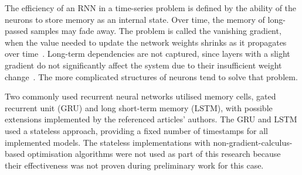 %
The efficiency of an RNN in a time-series problem is defined by the ability of the neurons to store memory as an internal state.
Over time, the memory of long-passed samples may fade away.
The problem is called the vanishing gradient, when the value needed to update the network weights shrinks as it propagates over time~\cite{rasifaghihi_predictive_2020}.
Long-term dependencies are not captured, since layers with a slight gradient do not significantly affect the system due to their insufficient weight change~\cite{rasifaghihi_predictive_2020,hochreiter_vanishing_1998}.
The more complicated structures of neurons tend to solve that problem.

%
Two commonly used recurrent neural networks utilised memory cells, gated recurrent unit (GRU) and long short-term memory (LSTM), with possible extensions implemented by the referenced articles' authors.
The GRU and LSTM used a stateless approach, providing a fixed number of timestamps for all implemented models.
The stateless implementations with non-gradient-calculus-based optimisation algorithms were not used as part of this research because their effectiveness was not proven during preliminary work for this case.

